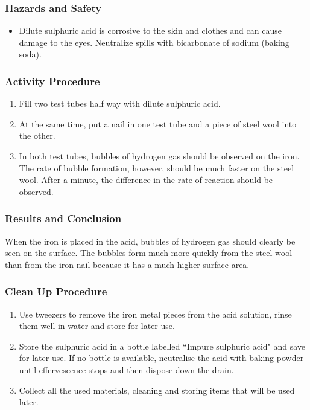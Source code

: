 \subsubsection*{Hazards and Safety}
\begin{itemize}
\item{Dilute sulphuric acid is corrosive to the skin and clothes and can cause damage to the eyes. Neutralize spills with bicarbonate of sodium (baking soda).}
\end{itemize}

\subsubsection*{Activity Procedure}
\begin{enumerate}
\item{Fill two test tubes half way with dilute sulphuric acid.}
\item{At the same time, put a nail in one test tube and a piece of steel wool into the other.}
\item{In both test tubes, bubbles of hydrogen gas should be observed on the iron. The rate of bubble formation, however, should be much faster on the steel wool. After a minute, the difference in the rate of reaction should be observed.}
\end{enumerate}

\subsubsection*{Results and Conclusion}
When the iron is placed in the acid, bubbles of hydrogen gas should clearly be seen on the surface. The bubbles form much more quickly from the steel wool than from the iron nail because it has a much higher surface area.

\subsubsection*{Clean Up Procedure}
\begin{enumerate}
\item{Use tweezers to remove the iron metal pieces from the acid solution, rinse them well in water and store for later use.}
\item{Store the sulphuric acid in a bottle labelled ``Impure sulphuric acid" and save for later use. If no bottle is available, neutralise the acid with baking powder until effervescence stops and then dispose down the drain.}
\item{Collect all the used materials, cleaning and storing items that will be used later.}
\end{enumerate}


